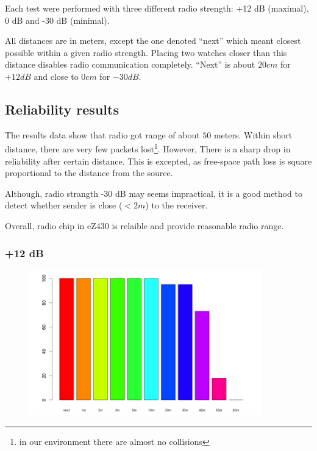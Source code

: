 Each test were performed with three different radio strength: +12 dB (maximal), 0 dB and -30 dB (minimal).

All distances are in meters, except the one denoted ``next''  which meant closest possible within a given radio strength.
Placing two watches closer than this distance disables radio communication completely.
``Next'' is about $20 cm$ for $+12 dB$ and close to $0 cm$ for $- 30 dB$.



\subsection{Reliability results}

The results data show that radio got range of about $50$ meters.
Within short distance, there are very few packets lost\footnote{in our environment there are almost no collisions}.
However, There is a sharp drop in reliability after certain distance.
This is excepted, as free-space path loss is square proportional to the distance from the source.

Although, radio strangth -30 dB may seems impractical, it is a good method to detect whether sender is close ($< 2m$) to the receiver.

Overall, radio chip in eZ430 is relaible and provide reasonable radio range.


\subsubsection{+12 dB}

\begin{figure}[H]
  \centering
  \includegraphics[width=0.9\textwidth]{img/tests/range/db_12.png}
\end{figure}


